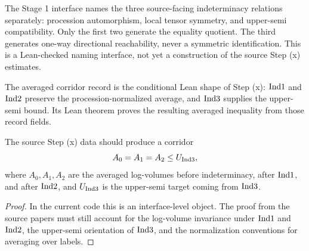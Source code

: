\begin{definition}
  \label{def:indeterminacy-generator-interface}
  \leanok
  The Stage 1 interface names the three source-facing indeterminacy
  relations separately: procession automorphism, local tensor symmetry, and
  upper-semi compatibility.  Only the first two generate the equality
  quotient.  The third generates one-way directional reachability, never a
  symmetric identification.  This is a Lean-checked naming interface, not yet
  a construction of the source Step (x) estimates.
\end{definition}

\begin{definition}
  \label{def:step-x-averaged-corridor-record}
  \leanok
  The averaged corridor record is the conditional Lean shape of Step (x):
  \(\mathrm{Ind1}\) and \(\mathrm{Ind2}\) preserve the procession-normalized average, and
  \(\mathrm{Ind3}\) supplies the upper-semi bound.  Its Lean theorem proves the
  resulting averaged inequality from those record fields.
\end{definition}

\begin{proposition}
  \label{prop:step-x-corridor}
  \notready
  The source Step (x) data should produce a corridor
  \[
    A_0 = A_1 = A_2 \le U_{\mathrm{Ind3}},
  \]
  where \(A_0,A_1,A_2\) are the averaged log-volumes before
  indeterminacy, after \(\mathrm{Ind1}\), and after \(\mathrm{Ind2}\), and
  \(U_{\mathrm{Ind3}}\) is the upper-semi target coming from \(\mathrm{Ind3}\).
\end{proposition}

\begin{proof}
  In the current code this is an interface-level object.  The proof from the
  source papers must still account for the log-volume invariance under
  \(\mathrm{Ind1}\) and \(\mathrm{Ind2}\), the upper-semi orientation of \(\mathrm{Ind3}\), and
  the normalization conventions for averaging over labels.
\end{proof}

